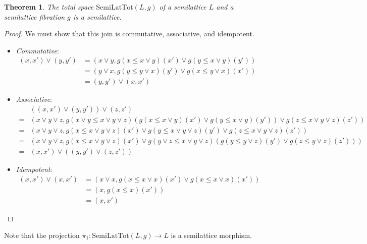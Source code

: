 \documentclass{article}
\newtheorem{theorem}{Theorem}
\begin{document}
      \begin{theorem}
        The total space $\mathrm{SemiLatTot}(L, g)$ of a semilattice $L$ and a semilattice fibration $g$ is a semilattice.
      \end{theorem}
      \begin{proof}
        We must show that this join is commutative, associative, and idempotent.
        \begin{itemize}
          \item \emph{Commutative}:
            \begin{align*}
              (x, x') \vee (y, y') &= \left(x \vee y, g(x \leq x \vee y)(x') \vee g(y \leq x \vee y)(y')\right) \\
              &= \left(y \vee x, g(y \leq y \vee x)(y') \vee g(x \leq y \vee x)(x')\right) \\
              &= (y, y') \vee (x, x')
            \end{align*}
          \item \emph{Associative}:
            \begin{align*} &((x, x') \vee (y, y')) \vee (z, z')  \\
              =& \left(x \vee y \vee z, g(x \vee y \leq x \vee y \vee z)(g(x \leq x \vee y)(x') \vee g(y \leq x \vee y)(y')) \vee g(z \leq x \vee y \vee z)(z')\right) \\
              =& \left(x \vee y \vee z, g(x \leq x \vee y \vee z)(x') \vee g(y \leq x \vee y \vee z)(y') \vee g(z \leq x \vee y \vee z)(z')\right) \\
              =& \left(x \vee y \vee z, g(x \leq x \vee y \vee z)(x') \vee g(y \vee z \leq x \vee y \vee z)(g(y \leq y \vee z)(y') \vee g(z \leq y \vee z)(z'))\right) \\
              =& (x, x') \vee ((y, y') \vee (z, z'))
            \end{align*}
          \item \emph{Idempotent}: 
            \begin{align*}
              (x, x') \vee (x, x') &= \left(x \vee x, g(x \leq x \vee x)(x') \vee g(x \leq x \vee x)(x')\right) \\
              &= \left(x, g(x \leq x)(x')\right) \\
              &= (x, x')
            \end{align*}
        \end{itemize}
      \end{proof}

      Note that the projection $\pi_1 : \mathrm{SemiLatTot}(L, g) \rightarrow L$ is a semilattice morphism.
\end{document}
